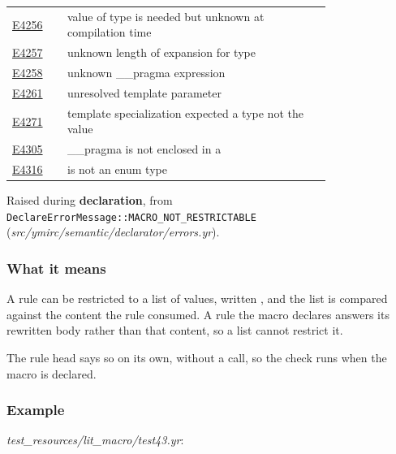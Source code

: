 \begin{longtable}{@{}l p{0.78\linewidth} r@{}}
\hyperref[sec:codes:e4256]{E4256} & value of type \errhole{} is needed but unknown at compilation time & \pageref{sec:codes:e4256}\\
\hyperref[sec:codes:e4257]{E4257} & unknown length of expansion for type \errhole{} & \pageref{sec:codes:e4257}\\
\hyperref[sec:codes:e4258]{E4258} & unknown \_\_pragma expression \errhole{} & \pageref{sec:codes:e4258}\\
\hyperref[sec:codes:e4261]{E4261} & unresolved template parameter \errhole{} & \pageref{sec:codes:e4261}\\
\hyperref[sec:codes:e4271]{E4271} & template specialization expected a type not the value \errhole{} & \pageref{sec:codes:e4271}\\
\hyperref[sec:codes:e4305]{E4305} & \_\_pragma \errhole{} is not enclosed in a \errhole{} & \pageref{sec:codes:e4305}\\
\hyperref[sec:codes:e4316]{E4316} & \errhole{} is not an enum type & \pageref{sec:codes:e4316}\\
\bottomrule
\end{longtable}

\label{sec:codes:e3040}

Raised during \textbf{declaration}, from \texttt{DeclareErrorMessage::\allowbreak{}MACRO\_\allowbreak{}NOT\_\allowbreak{}RESTRICTABLE} (\textit{src/\allowbreak{}ymirc/\allowbreak{}semantic/\allowbreak{}declarator/\allowbreak{}errors.yr}).

\subsubsection*{What it means}

A rule can be restricted to a list of values, written , and the list is compared against the content the rule consumed. A rule the macro declares answers its rewritten body rather than that content, so a list cannot restrict it.

The rule head says so on its own, without a call, so the check runs when the macro is declared.

\subsubsection*{Example}

\textit{test\_\allowbreak{}resources/\allowbreak{}lit\_\allowbreak{}macro/\allowbreak{}test43.yr}:

